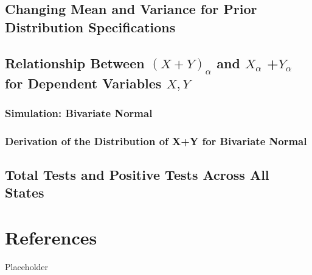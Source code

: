 \documentclass[12pt,twoside]{smiththesis}
\begin{document}
\hypertarget{changing-mean-and-variance-for-prior-distribution-specifications}{%
\section{Changing Mean and Variance for Prior Distribution Specifications}\label{changing-mean-and-variance-for-prior-distribution-specifications}}

\hypertarget{conservativeintervals}{%
\section{\texorpdfstring{Relationship Between \((X+Y)_\alpha\) and \(X_{\alpha}\) +\(Y_{\alpha}\) for Dependent Variables \(X,Y\)}{Relationship Between (X+Y)\_\textbackslash alpha and X\_\{\textbackslash alpha\} +Y\_\{\textbackslash alpha\} for Dependent Variables X,Y}}\label{conservativeintervals}}

\hypertarget{simulation-bivariate-normal}{%
\subsection{Simulation: Bivariate Normal}\label{simulation-bivariate-normal}}

\hypertarget{derivation-of-the-distribution-of-xy-for-bivariate-normal}{%
\subsection{Derivation of the Distribution of X+Y for Bivariate Normal}\label{derivation-of-the-distribution-of-xy-for-bivariate-normal}}

\hypertarget{total-tests-and-positive-tests-across-all-states}{%
\section{Total Tests and Positive Tests Across All States}\label{total-tests-and-positive-tests-across-all-states}}

\hypertarget{references}{%
\chapter*{References}\label{references}}

Placeholder
\end{document}
